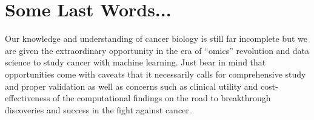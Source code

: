 \section*{Some Last Words...}

Our knowledge and understanding of cancer biology is still far incomplete but we are given the extraordinary opportunity in the era of ``omics'' revolution and data science to study cancer with machine learning. Just bear in mind that opportunities come with caveats that it necessarily calls for comprehensive study and proper validation as well as concerns such as clinical utility and cost-effectiveness of the computational findings on the road to breakthrough discoveries and success in the fight against cancer.
